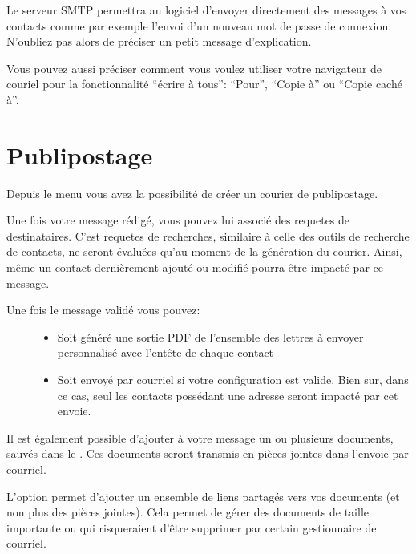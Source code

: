 \documentclass[a4paper,10pt,oneside,french]{sphinxmanual}
\begin{document}
Le serveur SMTP permettra au logiciel d’envoyer directement des messages à vos contacts comme par exemple l’envoi d’un nouveau mot de passe de connexion. N’oubliez pas alors de préciser un petit message d’explication.

Vous pouvez aussi préciser comment vous voulez utiliser votre navigateur de couriel pour la fonctionnalité “écrire à tous”: “Pour”, “Copie à” ou “Copie caché à”.


\section{Publipostage}
\label{\detokenize{mailing/mailing::doc}}\label{\detokenize{mailing/mailing:publipostage}}
Depuis le menu  vous avez la possibilité de créer un courier de publipostage.

Une fois votre message rédigé, vous pouvez lui associé des requetes de destinataires.
C’est requetes de recherches, similaire à celle des outils de recherche de contacts, ne seront évaluées qu’au moment de la génération du courier.
Ainsi, même un contact dernièrement ajouté ou modifié pourra être impacté par ce message.

\noindent{}
\begin{description}
\item[{Une fois le message validé vous pouvez:}] \leavevmode\begin{itemize}
\item {} 
Soit généré une sortie PDF de l’ensemble des lettres à envoyer personnalisé avec l’entête de chaque contact

\item {} 
Soit envoyé par courriel si votre configuration est valide. Bien sur, dans ce cas, seul les contacts possédant une adresse seront impacté par cet envoie.

\end{itemize}

\end{description}

Il est également possible d’ajouter à votre message un ou plusieurs documents, sauvés dans le .
Ces documents seront transmis en pièces-jointes dans l’envoie par courriel.

L’option  permet d’ajouter un ensemble de liens partagés vers vos documents (et non plus des pièces jointes).
Cela permet de gérer des documents de taille importante ou qui risqueraient d’être supprimer par certain gestionnaire de courriel.
\end{document}
